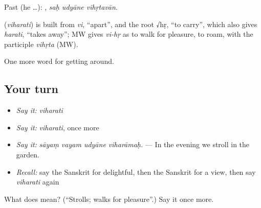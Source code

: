 Past (he …):   , \emph{saḥ udyāne vihṛtavān}.

\begin{cousinweb}
\textbf{} (\emph{viharati}) is built from \emph{vi}, \textquotedblleft{}apart\textquotedblright{}, and the root √hṛ, \textquotedblleft{}to carry\textquotedblright{}, which also gives \emph{harati}, \textquotedblleft{}takes away\textquotedblright{}; MW gives \emph{vi-hṛ} as to walk for pleasure, to roam, with the participle \emph{vihṛta} (MW).
\end{cousinweb}

\begin{grammarlens}[title={What you've built}]
One more word for getting around.
\end{grammarlens}

\subsection*{Your turn}
\begin{itemize}
\raggedright
  \item \emph{Say it:} \emph{viharati}
  \item \emph{Say it:} \emph{viharati}, once more
  \item \emph{Say it:} \emph{sāyaṃ vayam udyāne viharāmaḥ.} — In the evening we stroll in the garden.
  \item \emph{Recall:} say the Sanskrit for delightful, then the Sanskrit for a view, then say \emph{viharati} again
\end{itemize}

\begin{tcolorbox}[breakable,colback=teal!4,colframe=teal!35!black,title={Before you move on}]
What does  mean? (\textquotedblleft{}Strolls; walks for pleasure\textquotedblright{}.) Say it once more.
\end{tcolorbox}

